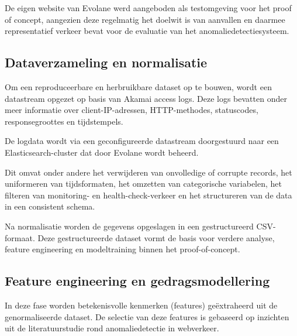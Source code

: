 De eigen website van Evolane werd aangeboden als testomgeving voor het proof of concept, aangezien deze regelmatig het doelwit is van aanvallen en daarmee representatief verkeer bevat voor de evaluatie van het anomaliedetectiesysteem.

\subsection{Dataverzameling en normalisatie}
\label{subsec:dataverzameling en normalisatie}

Om een reproduceerbare en herbruikbare dataset op te bouwen, wordt een datastream opgezet op basis van Akamai access logs. Deze logs bevatten onder meer informatie over client-IP-adressen, HTTP-methodes, statuscodes, responsegroottes en tijdstempels.

De logdata wordt via een geconfigureerde datastream doorgestuurd naar een Elasticsearch-cluster dat door Evolane wordt beheerd.

Dit omvat onder andere het verwijderen van onvolledige of corrupte records, het uniformeren van tijdsformaten, het omzetten van categorische variabelen, het filteren van monitoring- en health-check-verkeer en het structureren van de data in een consistent schema.

Na normalisatie worden de gegevens opgeslagen in een gestructureerd CSV-formaat. Deze gestructureerde dataset vormt de basis voor verdere analyse, feature engineering en modeltraining binnen het proof-of-concept.

\subsection{Feature engineering en gedragsmodellering}
\label{subsec:Feature engineering}

In deze fase worden betekenisvolle kenmerken (features) geëxtraheerd uit de genormaliseerde dataset. De selectie van deze features is gebaseerd op inzichten uit de literatuurstudie rond anomaliedetectie in webverkeer.

